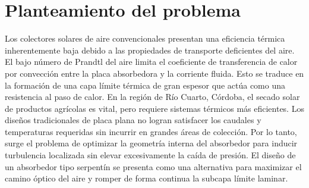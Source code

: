 \section{Planteamiento del problema}
\label{sec:cap01_planteamiento}

Los colectores solares de aire convencionales presentan una eficiencia térmica inherentemente baja debido a las propiedades de transporte deficientes del aire.
El bajo número de Prandtl del aire limita el coeficiente de transferencia de calor por convección entre la placa absorbedora y la corriente fluida.
Esto se traduce en la formación de una capa límite térmica de gran espesor que actúa como una resistencia al paso de calor.
En la región de Río Cuarto, Córdoba, el secado solar de productos agrícolas es vital, pero requiere sistemas térmicos más eficientes.
Los diseños tradicionales de placa plana no logran satisfacer los caudales y temperaturas requeridas sin incurrir en grandes áreas de colección.
Por lo tanto, surge el problema de optimizar la geometría interna del absorbedor para inducir turbulencia localizada sin elevar excesivamente la caída de presión.
El diseño de un absorbedor tipo serpentín se presenta como una alternativa para maximizar el camino óptico del aire y romper de forma continua la subcapa límite laminar.
